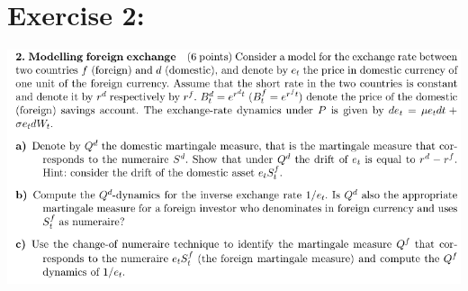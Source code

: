 \documentclass[document.tex]{subfiles}
\begin{document}
\section*{Exercise 2:}


\includegraphics[width=\textwidth]{ex2.png}
\end{document}
